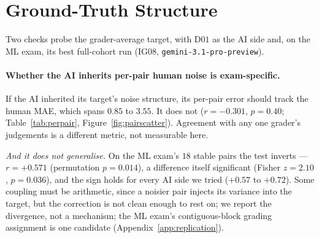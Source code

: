 \clearpage
\section{Ground-Truth Structure}
\label{sec:groundtruth}
\label{app:gt}

Two checks probe the grader-average target, with D$01$ as the AI side and, on the ML exam, its best full-cohort run (IG$08$, \texttt{gemini-3.1-pro-preview}).

\paragraph{Whether the AI inherits per-pair human noise is exam-specific.}
\label{sec:groundtruth:perpair}
If the AI inherited its target's noise structure, its per-pair error should track the human MAE, which spans $0.85$ to $3.55$. It does not ($r = -0.301$, $p = 0.40$; Table~\ref{tab:perpair}, Figure~\ref{fig:pairscatter}). Agreement with any one grader's judgements is a different metric, not measurable here.

\emph{And it does not generalise.} On the ML exam's $18$ stable pairs the test inverts --- $r = +0.571$ (permutation $p = 0.014$), a difference itself significant (Fisher $z = 2.10$, $p = 0.036$), and the sign holds for every AI side we tried ($+0.57$ to $+0.72$). Some coupling must be arithmetic, since a noisier pair injects its variance into the target, but the correction is not clean enough to rest on; we report the divergence, not a mechanism; the ML exam's contiguous-block grading assignment is one candidate (Appendix~\ref{app:replication}).

